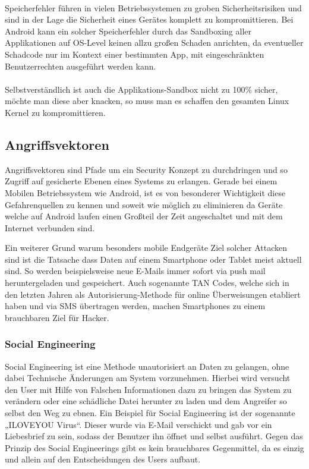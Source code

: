 \paragraph*{}
Speicherfehler führen in vielen Betriebssystemen zu groben Sicherheitsrisiken und sind in der Lage die Sicherheit eines Gerätes komplett zu kompromittieren. Bei Android kann ein solcher Speicherfehler durch das Sandboxing aller Applikationen auf OS-Level keinen allzu großen Schaden anrichten, da eventueller Schadcode nur im Kontext einer bestimmten App, mit eingeschränkten Benutzerrechten ausgeführt werden kann.
\paragraph*{}
Selbstverständlich ist auch die Applikations-Sandbox nicht zu 100\% sicher, möchte man diese aber knacken, so muss man es schaffen den gesamten Linux Kernel zu kompromittieren.
	
\subsection{Angriffsvektoren}
Angriffsvektoren sind Pfade um ein Security Konzept zu durchdringen und so Zugriff auf gesicherte Ebenen eines Systems zu erlangen. Gerade bei einem Mobilen Betriebssystem wie Android, ist es von besonderer Wichtigkeit diese Gefahrenquellen zu kennen und soweit wie möglich zu eliminieren da Geräte welche auf Android laufen einen Großteil der Zeit angeschaltet und mit dem Internet verbunden sind. \par
Ein weiterer Grund warum besonders mobile Endgeräte Ziel solcher Attacken sind ist die Tatsache dass Daten auf einem Smartphone oder Tablet meist aktuell sind. So werden beispielsweise neue E-Mails immer sofort via push mail heruntergeladen und gespeichert. Auch sogenannte TAN Codes, welche sich in den letzten Jahren als Autorisierung-Methode für online Überweisungen etabliert haben und via SMS übertragen werden, machen Smartphones zu einem brauchbaren Ziel für Hacker.
\subsubsection{Social Engineering}
Social Engineering ist eine Methode unautorisiert an Daten zu gelangen, ohne dabei Technische Änderungen am System vorzunehmen. Hierbei wird versucht den User mit Hilfe von Falschen Informationen dazu zu bringen das System zu verändern oder eine schädliche Datei herunter zu laden und dem Angreifer so selbst den Weg zu ebnen. Ein Beispiel für Social Engineering ist der sogenannte „ILOVEYOU Virus“. Dieser wurde via E-Mail verschickt und gab vor ein Liebesbrief zu sein, sodass der Benutzer ihn öffnet und selbst ausführt.
Gegen das Prinzip des Social Engineerings gibt es kein brauchbares Gegenmittel, da es einzig und allein auf den Entscheidungen des Users aufbaut.
\newpage
